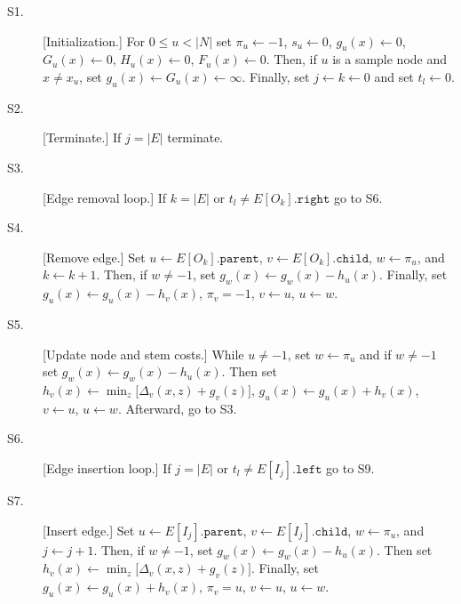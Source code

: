 \begin{description}

\item[S1.] [Initialization.]
    For $0 \leq u < |N|$
        set $\pi_u \leftarrow -1$,
        $s_u \leftarrow 0$,
        $g_u(x) \leftarrow 0$,
        $G_u(x) \leftarrow 0$,
        $H_u(x) \leftarrow 0$,
        $F_u(x) \leftarrow 0$.
        Then,
        if $u$ is a sample node and $x \neq x_u$,
            set $g_u(x) \leftarrow G_u(x) \leftarrow \infty$.
    Finally,
        set $j \leftarrow k \leftarrow 0$ and set $t_l \leftarrow 0$.

\item[S2.] [Terminate.]
    If $j = |E|$ terminate.

\item[S3.] [Edge removal loop.]
    If $k = |E|$ or $t_l \neq E[O_k].\texttt{right}$ go to S6.

\item[S4.] [Remove edge.]
    Set $u \leftarrow E[O_k].\texttt{parent}$,
        $v \leftarrow E[O_k].\texttt{child}$,
        $w \leftarrow \pi_u$, and
        $k \leftarrow k + 1$.
        Then,
        if $w \neq -1$,
            set $g_w(x) \leftarrow g_w(x) - h_u(x)$.
        Finally,
        set $g_u(x) \leftarrow g_u(x) - h_v(x)$,
        $\pi_v = -1$,
        $v \leftarrow u$,
        $u \leftarrow w$.

\item[S5.] [Update node and stem costs.]
    While $u \neq -1$,
        set $w \leftarrow \pi_u$ and
        if $w \neq -1$
            set $g_w(x) \leftarrow g_w(x) - h_u(x)$.
        Then set
        $h_v(x) \leftarrow \min_{z}\bigl[\Delta_v(x,z) + g_v(z)\bigr]$,
        $g_u(x) \leftarrow g_u(x) + h_v(x)$,
        $v \leftarrow u$, $u \leftarrow w$.
    Afterward, go to S3.

\item[S6.] [Edge insertion loop.]
    If $j = |E|$ or $t_l \neq E[I_j].\texttt{left}$ go to S9.

\item[S7.] [Insert edge.]
    Set $u \leftarrow E[I_j].\texttt{parent}$,
        $v \leftarrow E[I_j].\texttt{child}$,
        $w \leftarrow \pi_u$, and
        $j \leftarrow j + 1$.
        Then,
        if $w \neq -1$,
            set $g_w(x) \leftarrow g_w(x) - h_u(x)$.
        Then set
        $h_v(x) \leftarrow \min_{z}\bigl[\Delta_v(x,z) + g_v(z)\bigr]$.
        Finally,
        set $g_u(x) \leftarrow g_u(x) + h_v(x)$,
        $\pi_v = u$,
        $v \leftarrow u$,
        $u \leftarrow w$.


\end{description}
